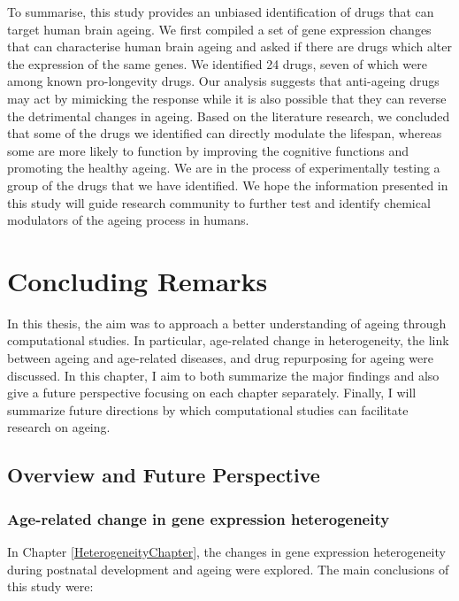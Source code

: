 \documentclass[12pt,twoside]{unicam}
\begin{document}
To summarise, this study provides an unbiased identification of drugs that can target human brain ageing. We first compiled a set of gene expression changes that can characterise human brain ageing and asked if there are drugs which alter the expression of the same genes. We identified 24 drugs, seven of which were among known pro-longevity drugs. Our analysis suggests that anti-ageing drugs may act by mimicking the response while it is also possible that they can reverse the detrimental changes in ageing. Based on the literature research, we concluded that some of the drugs we identified can directly modulate the lifespan, whereas some are more likely to function by improving the cognitive functions and promoting the healthy ageing. We are in the process of experimentally testing a group of the drugs that we have identified. We hope the information presented in this study will guide research community to further test and identify chemical modulators of the ageing process in humans.

\hypertarget{concludingRemarks}{%
\chapter{Concluding Remarks}\label{concludingRemarks}}

In this thesis, the aim was to approach a better understanding of ageing through computational studies. In particular, age-related change in heterogeneity, the link between ageing and age-related diseases, and drug repurposing for ageing were discussed. In this chapter, I aim to both summarize the major findings and also give a future perspective focusing on each chapter separately. Finally, I will summarize future directions by which computational studies can facilitate research on ageing.

\hypertarget{overview-and-future-perspective}{%
\section{Overview and Future Perspective}\label{overview-and-future-perspective}}

\hypertarget{age-related-change-in-gene-expression-heterogeneity-1}{%
\subsection{Age-related change in gene expression heterogeneity}\label{age-related-change-in-gene-expression-heterogeneity-1}}

In Chapter \ref{HeterogeneityChapter}, the changes in gene expression heterogeneity during postnatal development and ageing were explored. The main conclusions of this study were:
\end{document}
